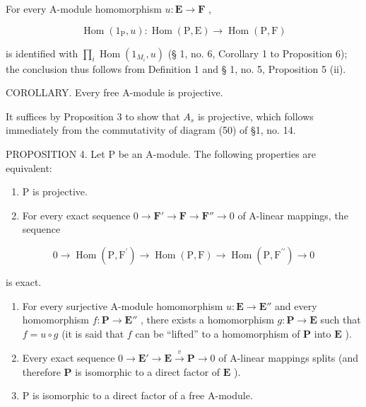 For every A-module homomorphism \(u: \mathbf{E} \to \mathbf{F}\) ,

\[
\operatorname{Hom} \left(1 _ {\mathrm{P}}, u\right): \operatorname{Hom} (\mathrm{P}, \mathrm{E}) \rightarrow \operatorname{Hom} (\mathrm{P}, \mathrm{F})
\]

is identified with \(\prod_{i}\operatorname{Hom}(1_{M_i},u)\) (§ 1, no. 6, Corollary 1 to Proposition 6); the conclusion thus follows from Definition 1 and § 1, no. 5, Proposition 5 (ii).

COROLLARY. Every free A-module is projective.

It suffices by Proposition 3 to show that \(A_{s}\) is projective, which follows immediately from the commutativity of diagram (50) of §1, no. 14.

PROPOSITION 4. Let P be an A-module. The following properties are equivalent:

\begin{enumerate}
\def\labelenumi{(\alph{enumi})}
\item
  P is projective.
\item
  For every exact sequence \(0 \to \mathbf{F}' \to \mathbf{F} \to \mathbf{F}'' \to 0\) of A-linear mappings, the sequence
\end{enumerate}

\[
0 \rightarrow \operatorname{Hom} (\mathrm{P}, \mathrm{F} ^ {\prime}) \rightarrow \operatorname{Hom} (\mathrm{P}, \mathrm{F}) \rightarrow \operatorname{Hom} (\mathrm{P}, \mathrm{F} ^ {\prime \prime}) \rightarrow 0
\]

is exact.

\begin{enumerate}
\def\labelenumi{(\alph{enumi})}
\setcounter{enumi}{2}
\item
  For every surjective A-module homomorphism \(u: \mathbf{E} \to \mathbf{E}''\) and every homomorphism \(f: \mathbf{P} \to \mathbf{E}''\) , there exists a homomorphism \(g: \mathbf{P} \to \mathbf{E}\) such that \(f = u \circ g\) (it is said that \(f\) can be ``lifted'' to a homomorphism of \(\mathbf{P}\) into \(\mathbf{E}\) ).
\item
  Every exact sequence \(0 \to \mathbf{E}' \to \mathbf{E} \xrightarrow{v} \mathbf{P} \to 0\) of A-linear mappings splits (and therefore \(\mathbf{P}\) is isomorphic to a direct factor of \(\mathbf{E}\) ).
\item
  P is isomorphic to a direct factor of a free A-module.
\end{enumerate}

